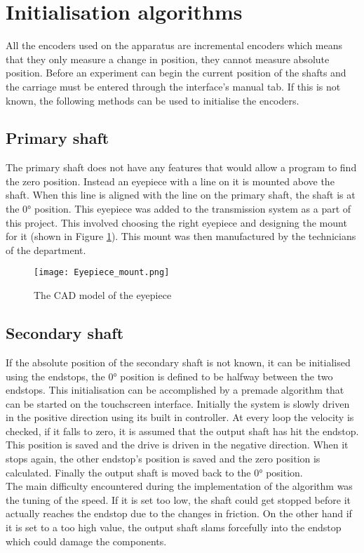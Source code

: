 \documentclass[12pt]{article}
\begin{document}
\pagebreak
\section{Initialisation algorithms}
All the encoders used on the apparatus are incremental encoders which means that they only measure a change in position, they cannot measure absolute position. Before an experiment can begin the current position of the shafts and the carriage must be entered through the interface's manual tab. If this is not known, the following methods can be used to initialise the encoders.

\subsection{Primary shaft}
The primary shaft does not have any features that would allow a program to find the zero position. Instead an eyepiece with a line on it is mounted above the shaft. When this line is aligned with the line on the primary shaft, the shaft is at the 0° position. This eyepiece was added to the transmission system as a part of this project. This involved choosing the right eyepiece and designing the mount for it (shown in Figure \ref{fig:eyepieceMount}). This mount was then manufactured by the technicians of the department. 

\begin{figure}[h]
    \centering
    \texttt{[image: Eyepiece\_mount.png]}
    \caption{The CAD model of the eyepiece}
    \label{fig:eyepieceMount}
\end{figure}



\subsection{Secondary shaft}
If the absolute position of the secondary shaft is not known, it can be initialised using the endstops, the 0° position is defined to be halfway between the two endstops. This initialisation can be accomplished by a premade algorithm that can be started on the touchscreen interface. Initially the system is slowly driven in the positive direction using its built in controller. At every loop the velocity is checked, if it falls to zero, it is assumed that the output shaft has hit the endstop. This position is saved and the drive is driven in the negative direction. When it stops again, the other endstop's position is saved and the zero position is calculated. Finally the output shaft is moved back to the 0° position.\\
The main difficulty encountered during the implementation of the algorithm was the tuning of the speed. If it is set too low, the shaft could get stopped before it actually reaches the endstop due to the changes in friction. On the other hand if it is set to a too high value, the output shaft slams forcefully into the endstop which could damage the components. 
\end{document}
